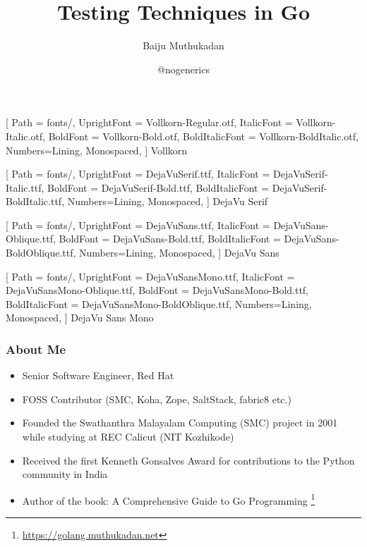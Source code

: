 \documentclass[aspectratio=169]{beamer}
\title{Testing Techniques in Go}
\author{Baiju Muthukadan}
\institute{Red Hat}
\date{@nogenerics}
\begin{document}
\beamertemplatenavigationsymbolsempty

\setmainfont
[ Path = fonts/,
UprightFont = DejaVuSerif.ttf,
ItalicFont = DejaVuSerif-Italic.ttf,
BoldFont = DejaVuSerif-Bold.ttf,
BoldItalicFont = DejaVuSerif-BoldItalic.ttf,
Numbers={Lining, Monospaced},
] {DejaVu Serif}

\setsansfont
[ Path = fonts/,
UprightFont = DejaVuSans.ttf,
ItalicFont = DejaVuSans-Oblique.ttf,
BoldFont = DejaVuSans-Bold.ttf,
BoldItalicFont = DejaVuSans-BoldOblique.ttf,
Numbers={Lining, Monospaced},
] {DejaVu Sans}

\setmonofont
[ Path = fonts/,
UprightFont = DejaVuSansMono.ttf,
ItalicFont = DejaVuSansMono-Oblique.ttf,
BoldFont = DejaVuSansMono-Bold.ttf,
BoldItalicFont = DejaVuSansMono-BoldOblique.ttf,
Numbers={Lining, Monospaced},
] {DejaVu Sans Mono}


\newfontfamily{\vollkorn}
[ Path = fonts/,
UprightFont = Vollkorn-Regular.otf,
ItalicFont = Vollkorn-Italic.otf,
BoldFont = Vollkorn-Bold.otf,
BoldItalicFont = Vollkorn-BoldItalic.otf,
Numbers={Lining, Monospaced},
] {Vollkorn}

\newfontfamily{\dejavuserif}
[ Path = fonts/,
UprightFont = DejaVuSerif.ttf,
ItalicFont = DejaVuSerif-Italic.ttf,
BoldFont = DejaVuSerif-Bold.ttf,
BoldItalicFont = DejaVuSerif-BoldItalic.ttf,
Numbers={Lining, Monospaced},
] {DejaVu Serif}

\newfontfamily{\dejavusans}
[ Path = fonts/,
UprightFont = DejaVuSans.ttf,
ItalicFont = DejaVuSans-Oblique.ttf,
BoldFont = DejaVuSans-Bold.ttf,
BoldItalicFont = DejaVuSans-BoldOblique.ttf,
Numbers={Lining, Monospaced},
] {DejaVu Sans}

\newfontfamily{\dejavumono}
[ Path = fonts/,
UprightFont = DejaVuSansMono.ttf,
ItalicFont = DejaVuSansMono-Oblique.ttf,
BoldFont = DejaVuSansMono-Bold.ttf,
BoldItalicFont = DejaVuSansMono-BoldOblique.ttf,
Numbers={Lining, Monospaced},
] {DejaVu Sans Mono}

\frame{\titlepage}

\begin{frame}
  \frametitle{About Me}

  \begin{itemize}
  \item Senior Software Engineer, Red Hat
  \item FOSS Contributor (SMC, Koha, Zope, SaltStack, fabric8 etc.)
  \item Founded the Swathanthra Malayalam Computing (SMC) project in 2001 while studying at REC Calicut (NIT Kozhikode)
  \item Received the first Kenneth Gonsalves Award for contributions to the Python community in India
  \item Author of the book: A Comprehensive Guide to Go Programming \footnote{\url{https://golang.muthukadan.net}}
  \end{itemize}

\end{frame}
\end{document}
